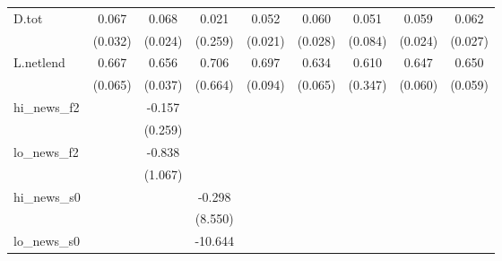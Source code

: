 {\begin{tabular}{l*{8}{c}}
\addlinespace
D.tot       &       0.067\sym{**} &       0.068\sym{***}&       0.021         &       0.052\sym{**} &       0.060\sym{**} &       0.051         &       0.059\sym{**} &       0.062\sym{**} \\
            &     (0.032)         &     (0.024)         &     (0.259)         &     (0.021)         &     (0.028)         &     (0.084)         &     (0.024)         &     (0.027)         \\
\addlinespace
L.netlend   &       0.667\sym{***}&       0.656\sym{***}&       0.706         &       0.697\sym{***}&       0.634\sym{***}&       0.610\sym{*}  &       0.647\sym{***}&       0.650\sym{***}\\
            &     (0.065)         &     (0.037)         &     (0.664)         &     (0.094)         &     (0.065)         &     (0.347)         &     (0.060)         &     (0.059)         \\
\addlinespace
hi\_news\_f2  &                     &      -0.157         &                     &                     &                     &                     &                     &                     \\
            &                     &     (0.259)         &                     &                     &                     &                     &                     &                     \\
\addlinespace
lo\_news\_f2  &                     &      -0.838         &                     &                     &                     &                     &                     &                     \\
            &                     &     (1.067)         &                     &                     &                     &                     &                     &                     \\
\addlinespace
hi\_news\_s0  &                     &                     &      -0.298         &                     &                     &                     &                     &                     \\
            &                     &                     &     (8.550)         &                     &                     &                     &                     &                     \\
\addlinespace
lo\_news\_s0  &                     &                     &     -10.644         &                     &                     &                     &                     &                     \\

\end{tabular}}
